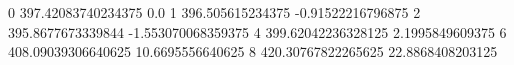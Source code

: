 0 397.42083740234375 0.0
1 396.505615234375 -0.91522216796875
2 395.8677673339844 -1.553070068359375
4 399.62042236328125 2.1995849609375
6 408.09039306640625 10.6695556640625
8 420.30767822265625 22.8868408203125
